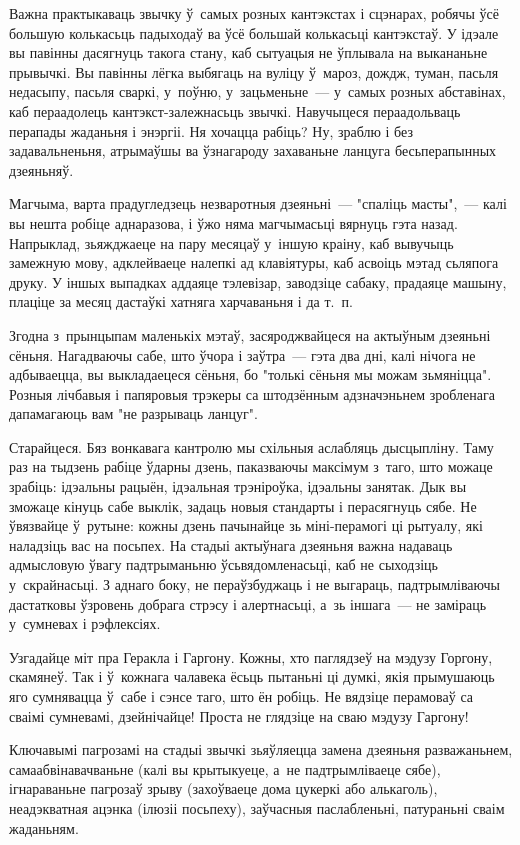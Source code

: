 Важна практыкаваць звычку ў~самых розных кантэкстах і сцэнарах, робячы ўсё большую колькасьць падыходаў ва ўсё большай колькасьці кантэкстаў. У ідэале вы павінны дасягнуць такога стану, каб сытуацыя не ўплывала на выкананьне прывычкі. Вы павінны лёгка выбягаць на вуліцу ў~мароз, дождж, туман, пасьля недасыпу, пасьля сваркі, у~поўню, у~зацьменьне~--- у~самых розных абставінах, каб пераадолець кантэкст-залежнасьць звычкі. Навучыцеся пераадольваць перапады жаданьня і энэргіі. Ня хочацца рабіць? Ну, зраблю і без задавальненьня, атрымаўшы ва ўзнагароду захаваньне ланцуга бесьперапынных дзеяньняў.

Магчыма, варта прадугледзець незваротныя дзеяньні~--- "спаліць масты",~--- калі вы нешта робіце аднаразова, і ўжо няма магчымасьці вярнуць гэта назад. Напрыклад, зьяжджаеце на пару месяцаў у~іншую краіну, каб вывучыць замежную мову, адклейваеце налепкі ад клавіятуры, каб асвоіць мэтад сьляпога друку. У іншых выпадках аддаяце тэлевізар, заводзіце сабаку, прадаяце машыну, плаціце за месяц дастаўкі хатняга харчаваньня і да т.~п.

Згодна з~прынцыпам маленькіх мэтаў, засяроджвайцеся на актыўным дзеяньні сёньня. Нагадваючы сабе, што ўчора і заўтра~--- гэта два дні, калі нічога не адбываецца, вы выкладаецеся сёньня, бо "толькі сёньня мы можам зьмяніцца". Розныя лічбавыя і папяровыя трэкеры са штодзённым адзначэньнем зробленага дапамагаюць вам "не разрываць ланцуг".

Старайцеся. Бяз вонкавага кантролю мы схільныя аслабляць дысцыпліну. Таму раз на тыдзень рабіце ўдарны дзень, паказваючы максімум з~таго, што можаце зрабіць: ідэальны рацыён, ідэальная трэніроўка, ідэальны занятак. Дык вы зможаце кінуць сабе выклік, задаць новыя стандарты і перасягнуць сябе. Не ўвязвайце ў~рутыне: кожны дзень пачынайце зь міні-перамогі ці рытуалу, які наладзіць вас на посьпех. На стадыі актыўнага дзеяньня важна надаваць адмысловую ўвагу падтрыманьню ўсьвядомленасьці, каб не сыходзіць у~скрайнасьці. З аднаго боку, не пераўзбуджаць і не выгараць, падтрымліваючы дастатковы ўзровень добрага стрэсу і алертнасьці, а~зь іншага~--- не заміраць у~сумневах і рэфлексіях.

Узгадайце міт пра Геракла і Гаргону. Кожны, хто паглядзеў на мэдузу Горгону, скамянеў. Так і ў~кожнага чалавека ёсьць пытаньні ці думкі, якія прымушаюць яго сумнявацца ў~сабе і сэнсе таго, што ён робіць. Не вядзіце перамоваў са сваімі сумневамі, дзейнічайце! Проста не глядзіце на сваю мэдузу Гаргону!

Ключавымі пагрозамі на стадыі звычкі зьяўляецца замена дзеяньня разважаньнем, самаабвінавачваньне (калі вы крытыкуеце, а~не падтрымліваеце сябе), ігнараваньне пагрозаў зрыву (захоўваеце дома цукеркі або алькаголь), неадэкватная ацэнка (ілюзіі посьпеху), заўчасныя паслабленьні, патураньні сваім жаданьням.

